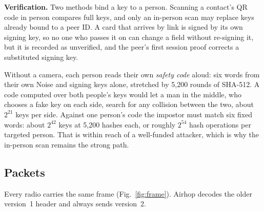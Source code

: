 \documentclass[conference]{IEEEtran}
\begin{document}
\textbf{Verification.} Two methods bind a key to a person. Scanning a contact's QR code in person compares full keys, and only an in-person scan may replace keys already bound to a peer ID. A card that arrives by link is signed by its own signing key, so no one who passes it on can change a field without re-signing it, but it is recorded as unverified, and the peer's first session proof corrects a substituted signing key.

Without a camera, each person reads their own \emph{safety code} aloud: six words from their own Noise and signing keys alone, stretched by 5,200 rounds of SHA-512. A code computed over both people's keys would let a man in the middle, who chooses a fake key on each side, search for any collision between the two, about $2^{21}$ keys per side. Against one person's code the impostor must match six fixed words: about $2^{42}$ keys at 5,200 hashes each, or roughly $2^{54}$ hash operations per targeted person. That is within reach of a well-funded attacker, which is why the in-person scan remains the strong path.

\subsection{Packets}
\label{sec:packets}

Every radio carries the same frame (Fig.~\ref{fig:frame}). Airhop decodes the older version~1 header and always sends version~2.
\end{document}
